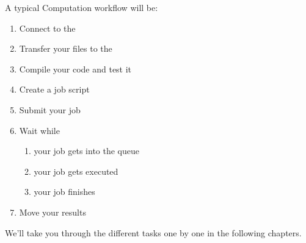 A typical Computation workflow will be:

\begin{enumerate}
  \item  Connect to the \hpc
  \item  Transfer your files to the \hpc
  \item  Compile your code and test it
  \item  Create a job script
  \item  Submit your job
  \item  Wait while
  \begin{enumerate}
    \item  your job gets into the queue
    \item  your job gets executed
    \item  your job finishes
  \end{enumerate}
  \item  Move your results
\end{enumerate}

We'll take you through the different tasks one by one in the following
chapters.

